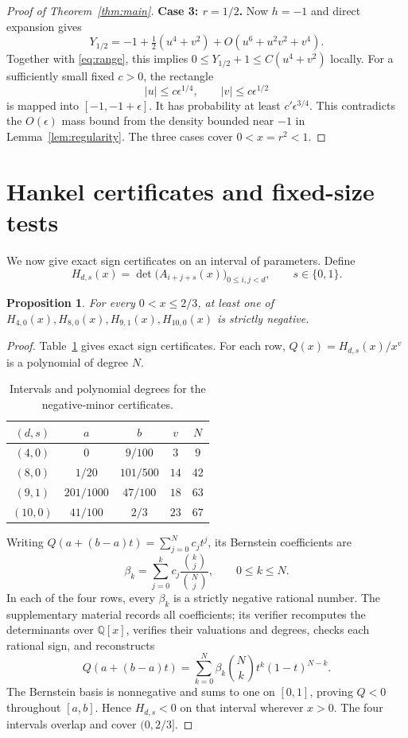 \documentclass[11pt]{article}
\newtheorem{proposition}[theorem]{Proposition}
\begin{document}
\begin{proof}[Proof of Theorem~\ref{thm:main}]
\medskip\noindent\textbf{Case 3: $r=1/2$.}
Now $h=-1$ and direct expansion gives
\begin{equation}\label{eq:quartic}
 Y_{1/2}=-1+\tfrac12(u^4+v^2)
                 +O(u^6+u^2v^2+v^4).
\end{equation}
Together with \eqref{eq:range}, this implies
$0\le Y_{1/2}+1\le C(u^4+v^2)$ locally.
For a sufficiently small fixed $c>0$, the rectangle
\[
 |u|\le c\epsilon^{1/4},\qquad |v|\le c\epsilon^{1/2}
\]
is mapped into $[-1,-1+\epsilon]$. It has probability at least
$c'\epsilon^{3/4}$. This contradicts the $O(\epsilon)$ mass bound
from the density bounded near $-1$ in Lemma~\ref{lem:regularity}.
The three cases cover $0<x=r^2<1$.
\end{proof}




\section{Hankel certificates and fixed-size tests}\label{sec:hankel}
We now give exact sign certificates on an interval of parameters. Define
\[
 H_{d,s}(x)=\det\bigl(A_{i+j+s}(x)\bigr)_{0\le i,j<d},\qquad s\in\{0,1\}.
\]
\begin{proposition}\label{prop:finite}
For every $0<x\le2/3$, at least one of
$H_{4,0}(x),H_{8,0}(x),H_{9,1}(x),H_{10,0}(x)$ is strictly negative.
\end{proposition}
\begin{proof}
Table~\ref{tab:certificates} gives exact sign certificates. For each row,
$Q(x)=H_{d,s}(x)/x^v$ is a polynomial of degree $N$.

\begin{table}[ht]
\centering
\caption{Intervals and polynomial degrees for the negative-minor certificates.}
\label{tab:certificates}
\begin{tabular}{ccccc}
\toprule
$(d,s)$ & $a$ & $b$ & $v$ & $N$\\[2pt]
\midrule
$(4,0)$ & $0$ & $9/100$ & $3$ & $9$\\
$(8,0)$ & $1/20$ & $101/500$ & $14$ & $42$\\
$(9,1)$ & $201/1000$ & $47/100$ & $18$ & $63$\\
$(10,0)$ & $41/100$ & $2/3$ & $23$ & $67$
\\\bottomrule
\end{tabular}
\end{table}

Writing $Q(a+(b-a)t)=\sum_{j=0}^N c_jt^j$, its Bernstein coefficients are
\[
 \beta_k=\sum_{j=0}^k c_j\frac{\binom{k}{j}}{\binom{N}{j}},
 \qquad 0\le k\le N.
\]
In each of the four rows, every $\beta_k$ is a strictly negative rational
number. The supplementary material records all coefficients; its
verifier recomputes the determinants over $\mathbb Q[x]$, verifies their
valuations and degrees, checks each rational sign, and reconstructs
\[
 Q(a+(b-a)t)=\sum_{k=0}^N\beta_k\binom Nk t^k(1-t)^{N-k}.
\]
The Bernstein basis is nonnegative and sums to one on $[0,1]$, proving
$Q<0$ throughout $[a,b]$. Hence $H_{d,s}<0$ on that interval wherever
$x>0$. The four intervals overlap and cover $(0,2/3]$.
\end{proof}
\end{document}
